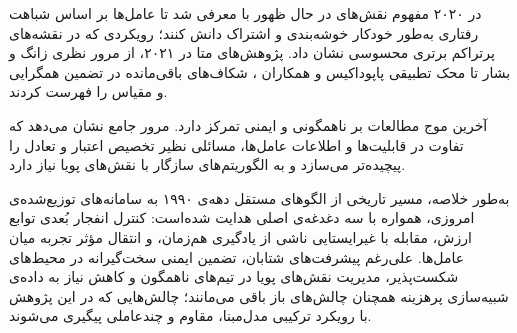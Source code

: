 در ۲۰۲۰ مفهوم نقش‌های در حال ظهور با  \cite{Wang2020ROMA} معرفی شد تا عامل‌ها بر اساس شباهت رفتاری به‌طور خودکار خوشه‌بندی و اشتراک دانش کنند؛ رویکردی که در نقشه‌های پرتراکم  برتری محسوسی نشان داد. پژوهش‌های متا در ۲۰۲۱، از مرور نظری زانگ و بشار \cite{Zhang2021Survey} تا 
محک
 تطبیقی پاپوداکیس و همکاران
\cite{9583665}،
 شکاف‌های باقی‌مانده در تضمین همگرایی و مقیاس را فهرست کردند. 

آخرین موج مطالعات بر ناهمگونی و ایمنی تمرکز دارد. مرور جامع \cite{Yu2022Heterogeneous} نشان می‌دهد که تفاوت در قابلیت‌ها و اطلاعات عامل‌ها، مسائلی نظیر تخصیص اعتبار و تعادل را پیچیده‌تر می‌سازد و به الگوریتم‌های سازگار با نقش‌های پویا نیاز دارد.

به‌طور خلاصه، مسیر تاریخی  از الگوهای مستقل دهه‌ی ۱۹۹۰ به سامانه‌های توزیع‌شده‌ی امروزی، همواره با سه دغدغه‌ی اصلی هدایت شده‌است: کنترل انفجار بُعدی توابع ارزش، مقابله با غیرایستایی ناشی از یادگیری هم‌زمان، و انتقال مؤثر تجربه میان عامل‌ها. علی‌رغم پیشرفت‌های شتابان، تضمین ایمنی سخت‌گیرانه در محیط‌های شکست‌پذیر، مدیریت نقش‌های پویا در تیم‌های ناهمگون و کاهش نیاز به داده‌ی شبیه‌سازی پرهزینه همچنان چالش‌های باز باقی می‌مانند؛ چالش‌هایی که در این پژوهش با رویکرد ترکیبی مدل‌مبنا، مقاوم و چندعاملی پیگیری می‌شوند.
